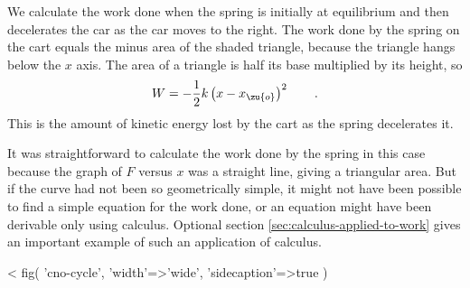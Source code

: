 We calculate the work done when the spring is initially at
equilibrium and then decelerates the car as the car moves to
the right. The work done by the spring on the cart equals
the minus area of the shaded triangle, because the triangle
hangs below the $x$ axis. The area of a triangle is half its
base multiplied by its height, so
\begin{equation*}
  W = -\frac{1}{2}k\left(x-x_\zu{o}\right)^2  \qquad .
\end{equation*}
This is the amount of kinetic energy lost by the cart as the
spring decelerates it.

It was straightforward to calculate the work done by the
spring in this case because the graph of $F$ versus $x$ was
a straight line, giving a triangular area. But if the curve
had not been so geometrically simple, it might not have been
possible to find a simple equation for the work done, or an
equation might have been derivable only using calculus.
Optional section \ref{sec:calculus-applied-to-work} gives an important example of such an
application of calculus.


<%
  fig(
    'cno-cycle',
    {
      'width'=>'wide',
      'sidecaption'=>true
    }
  )


